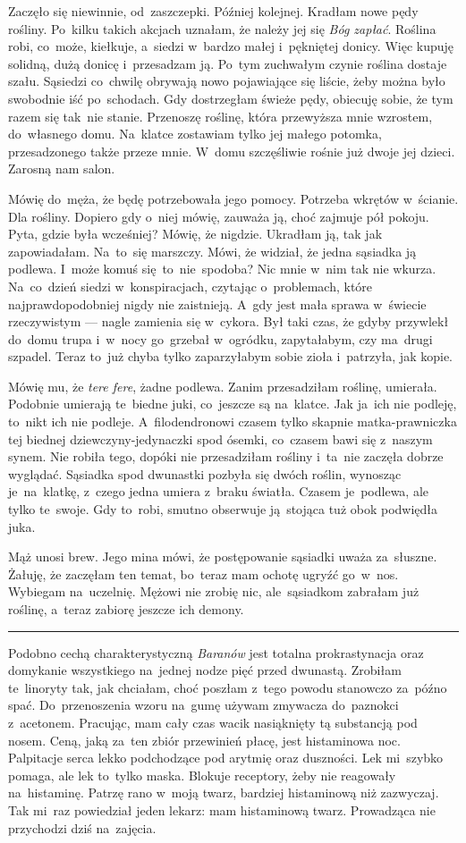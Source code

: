 \documentclass[9pt, a5paper]{memoir}
\begin{document}
Zaczęło się niewinnie, od~zaszczepki. Później kolejnej. Kradłam nowe pędy rośliny. Po~kilku takich akcjach uznałam, że należy jej się \textit{Bóg zapłać}. Roślina robi, co~może, kiełkuje, a~siedzi w~bardzo małej i~pękniętej donicy. Więc kupuję solidną, dużą donicę i~przesadzam ją. Po~tym zuchwałym czynie roślina dostaje szału. Sąsiedzi co~chwilę obrywają nowo pojawiające się liście, żeby można było swobodnie iść po~schodach. Gdy dostrzegłam świeże pędy, obiecuję sobie, że tym razem się tak~nie stanie. Przenoszę roślinę, która przewyższa mnie wzrostem, do~własnego domu. Na~klatce zostawiam tylko jej małego potomka, przesadzonego także przeze mnie. W~domu szczęśliwie rośnie już dwoje jej dzieci. Zarosną nam salon.

Mówię do~męża, że będę potrzebowała jego pomocy. Potrzeba wkrętów w~ścianie. Dla rośliny. Dopiero gdy o~niej mówię, zauważa ją, choć zajmuje pół pokoju. Pyta, gdzie była wcześniej? Mówię, że nigdzie. Ukradłam ją, tak jak zapowiadałam. Na~to~się marszczy. Mówi, że widział, że jedna sąsiadka ją podlewa. I~może komuś się~to~nie~spodoba? Nic mnie w~nim tak nie wkurza. Na~co~dzień siedzi w~konspiracjach, czytając o~problemach, które najprawdopodobniej nigdy nie zaistnieją. A~gdy jest mała sprawa w~świecie rzeczywistym --- nagle zamienia się w~cykora. Był taki czas, że gdyby przywlekł do~domu trupa i~w~nocy go~grzebał w~ogródku, zapytałabym, czy ma~drugi szpadel. Teraz to~już chyba tylko zaparzyłabym sobie zioła i~patrzyła, jak kopie.

Mówię mu, że \textit{tere fere}, żadne podlewa. Zanim przesadziłam roślinę, umierała. Podobnie umierają te~biedne juki, co~jeszcze są na~klatce. Jak ja~ich nie podleję, to~nikt ich nie podleje. A~filodendronowi czasem tylko skapnie matka-prawniczka tej biednej dziewczyny-jedynaczki spod ósemki, co~czasem bawi się z~naszym synem. Nie robiła tego, dopóki nie przesadziłam rośliny i~ta~nie zaczęła dobrze wyglądać. Sąsiadka spod dwunastki pozbyła się dwóch roślin, wynosząc je~na~klatkę, z~czego jedna umiera z~braku światła. Czasem je~podlewa, ale tylko te~swoje. Gdy to~robi, smutno obserwuje ją~stojąca tuż obok podwiędła juka.

Mąż unosi brew. Jego mina mówi, że postępowanie sąsiadki uważa za~słuszne. Żałuję, że zaczęłam ten temat, bo~teraz mam ochotę ugryźć go~w~nos. Wybiegam na~uczelnię. Mężowi nie zrobię nic, ale~sąsiadkom zabrałam już roślinę, a~teraz zabiorę jeszcze ich demony.

\fancybreak{* \quad * \quad *}

Podobno cechą charakterystyczną \textit{Baranów} jest totalna prokrastynacja oraz domykanie wszystkiego na~jednej nodze pięć przed dwunastą. Zrobiłam te~linoryty tak, jak chciałam, choć poszłam z~tego powodu stanowczo za~późno spać. Do~przenoszenia wzoru na~gumę używam zmywacza do~paznokci z~acetonem. Pracując, mam cały czas wacik nasiąknięty tą substancją pod nosem. Ceną, jaką za~ten zbiór przewinień płacę, jest histaminowa noc. Palpitacje serca lekko podchodzące pod arytmię oraz duszności. Lek mi~szybko pomaga, ale lek to~tylko maska. Blokuje receptory, żeby nie reagowały na~histaminę. Patrzę rano w~moją twarz, bardziej histaminową niż zazwyczaj. Tak mi~raz powiedział jeden lekarz: mam histaminową twarz. Prowadząca nie przychodzi dziś na~zajęcia.
\end{document}
